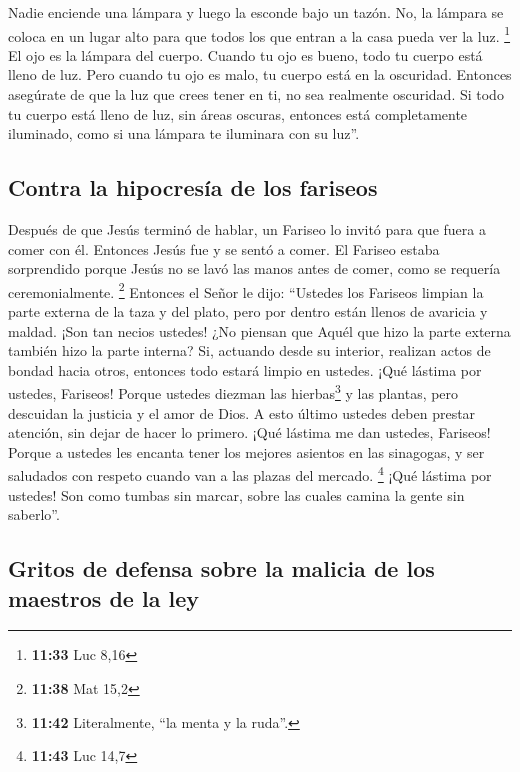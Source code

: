  Nadie enciende una lámpara y luego la esconde bajo un
tazón. No, la lámpara se coloca en un lugar alto para que todos los que
entran a la casa pueda ver la luz. \footnote{\textbf{11:33} Luc 8,16}
 El ojo es la lámpara del cuerpo. Cuando tu ojo es bueno,
todo tu cuerpo está lleno de luz. Pero cuando tu ojo es malo, tu cuerpo
está en la oscuridad.  Entonces asegúrate de que la luz
que crees tener en ti, no sea realmente oscuridad.  Si
todo tu cuerpo está lleno de luz, sin áreas oscuras, entonces está
completamente iluminado, como si una lámpara te iluminara con su luz''.

\hypertarget{contra-la-hipocresuxeda-de-los-fariseos}{%
\subsection{Contra la hipocresía de los
fariseos}\label{contra-la-hipocresuxeda-de-los-fariseos}}

 Después de que Jesús terminó de hablar, un Fariseo lo
invitó para que fuera a comer con él. Entonces Jesús fue y se sentó a
comer.  El Fariseo estaba sorprendido porque Jesús no se
lavó las manos antes de comer, como se requería ceremonialmente.
\footnote{\textbf{11:38} Mat 15,2}  Entonces el Señor le
dijo: ``Ustedes los Fariseos limpian la parte externa de la taza y del
plato, pero por dentro están llenos de avaricia y maldad.
 ¡Son tan necios ustedes! ¿No piensan que Aquél que hizo
la parte externa también hizo la parte interna?  Si,
actuando desde su interior, realizan actos de bondad hacia otros,
entonces todo estará limpio en ustedes.  ¡Qué lástima por
ustedes, Fariseos! Porque ustedes diezman las hierbas\footnote{\textbf{11:42}
  Literalmente, ``la menta y la ruda''.} y las plantas, pero descuidan
la justicia y el amor de Dios. A esto último ustedes deben prestar
atención, sin dejar de hacer lo primero.  ¡Qué lástima me
dan ustedes, Fariseos! Porque a ustedes les encanta tener los mejores
asientos en las sinagogas, y ser saludados con respeto cuando van a las
plazas del mercado. \footnote{\textbf{11:43} Luc 14,7} 
¡Qué lástima por ustedes! Son como tumbas sin marcar, sobre las cuales
camina la gente sin saberlo''.

\hypertarget{gritos-de-defensa-sobre-la-malicia-de-los-maestros-de-la-ley}{%
\subsection{Gritos de defensa sobre la malicia de los maestros de la
ley}\label{gritos-de-defensa-sobre-la-malicia-de-los-maestros-de-la-ley}}

